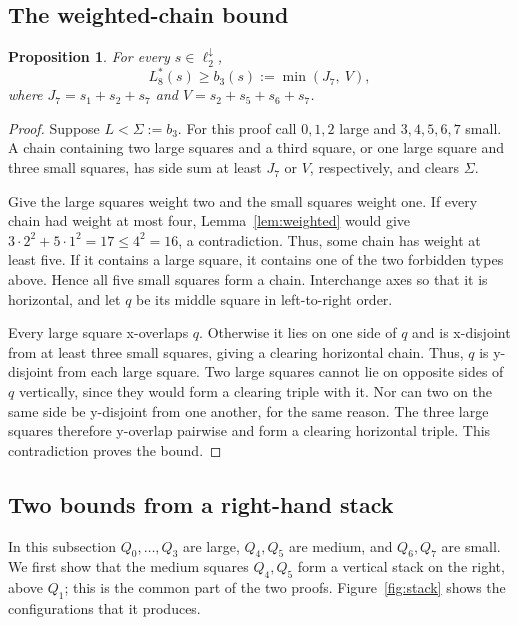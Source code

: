 \documentclass[12pt]{amsart}
\newtheorem{proposition}[theorem]{Proposition}
\theoremstyle{definition}
\theoremstyle{remark}
\numberwithin{equation}{section}
\numberwithin{figure}{section}
\numberwithin{table}{section}
\begin{document}
\subsection{The weighted-chain bound}\label{sec:weighted-bound}
\begin{proposition}\label{prop:ell4}
For every $s\in\ell_2^\downarrow$,
\[
L_8^*(s)\ge b_3(s):=\min(J_7,\ V),
\]
where $J_7=s_1+s_2+s_7$ and $V=s_2+s_5+s_6+s_7$.
\end{proposition}
\begin{proof}
Suppose $L<\Sigma:=b_3$. For this proof call $0,1,2$ large and
$3,4,5,6,7$ small. A
chain containing two large squares and a third square, or one large square
and three small squares, has side sum at least $J_7$ or $V$, respectively,
and clears $\Sigma$.

Give the large squares weight two and the small squares weight one. If
every chain had weight at most four, Lemma~\ref{lem:weighted} would give
$3\cdot2^2+5\cdot1^2=17\le4^2=16$, a contradiction.
Thus, some chain has weight at least five. If it contains a large square,
it contains one of the two forbidden types above. Hence all five small
squares form a chain. Interchange axes so that it is horizontal, and let
$q$ be its middle square in left-to-right order.

Every large square x-overlaps $q$. Otherwise it lies on one
side of $q$ and is x-disjoint from at least three small squares, giving
a clearing horizontal chain. Thus, $q$ is y-disjoint from each large square.
Two large squares cannot lie on opposite sides of $q$ vertically, since
they would form a clearing triple with it. Nor can two on the same side
be y-disjoint from one another, for the same reason. The three large
squares therefore y-overlap pairwise and form a clearing
horizontal triple. This contradiction proves the bound.
\end{proof}

\subsection{Two bounds from a right-hand stack}\label{sec:stack}
In this subsection $Q_0,\ldots,Q_3$ are large, $Q_4,Q_5$ are medium, and
$Q_6,Q_7$ are small. We first show that the medium squares $Q_4,Q_5$ form a
vertical stack on the right, above $Q_1$; this is the common part of the two
proofs.
Figure~\ref{fig:stack} shows the configurations that it produces.
\end{document}
